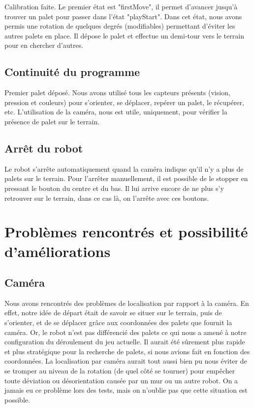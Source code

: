 \documentclass[preprint,12pt]{elsarticle}
\begin{document}
Calibration faite. Le premier état est "firstMove", il permet d'avancer jusqu'à trouver un palet pour passer dans l'état "playStart". Dans cet état, nous avons permis une rotation de quelques degrés (modifiables) permettant d'éviter les autres palets en place. Il dépose le palet et effectue un demi-tour vers le terrain pour en chercher d'autres.

\subsection{Continuité du programme}

Premier palet déposé. Nous avons utilisé tous les capteurs présents (vision, pression et couleurs) pour s'orienter, se déplacer, repérer un palet, le récupérer, etc. L'utilisation de la caméra, nous est utile, uniquement, pour vérifier la présence de palet sur le terrain. 

\subsection{Arrêt du robot}

Le robot s'arrête automatiquement quand la caméra indique qu'il n'y a plus de palets sur le terrain. Pour l'arrêter manuellement, il est possible de le stopper en pressant le bouton du centre et du bas. Il lui arrive encore de ne plus s'y retrouver sur le terrain, dans ce cas là, on l'arrête avec ces boutons.

\section{Problèmes rencontrés et possibilité d'améliorations}
\label{S:3}

\subsection{Caméra}

Nous avons rencontrés des problèmes de localisation par rapport à la caméra. En effet, notre idée de départ était de savoir se situer sur le terrain, puis de s'orienter, et de se déplacer grâce aux coordonnées des palets que fournit la caméra. Or, le robot n'est pas différencié des palets ce qui nous a amené à notre configuration du déroulement du jeu actuelle.
Il aurait été sûrement plus rapide et plus stratégique pour la recherche de palets, si nous avions fait en fonction des coordonnées.
La localisation par caméra aurait tout aussi bien pu nous éviter de se tromper au niveau de la rotation (de quel côté se tourner) pour empêcher toute déviation ou désorientation causée par un mur ou un autre robot. On a jamais eu ce problème lors des tests, mais on n'oublie pas que cette situation est possible.
\end{document}
